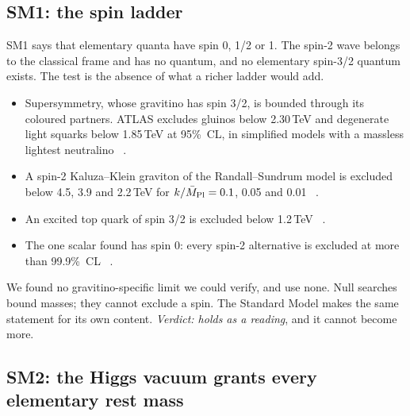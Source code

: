 \subsection{SM1: the spin ladder}\label{sec:sm-spin}

SM1 says that elementary quanta have spin 0, 1/2 or 1. The spin-2 wave belongs to the classical frame and has no quantum, and no elementary
spin-3/2 quantum exists. The test is the absence of what a richer ladder would add.
\begin{itemize}[nosep]
\item Supersymmetry, whose gravitino has spin 3/2, is bounded through its coloured partners. ATLAS excludes gluinos below 2.30\,TeV and
degenerate light squarks below 1.85\,TeV at 95\%~CL, in simplified models with a massless lightest neutralino~\cite{atlas2021a}
.
\item A spin-2 Kaluza--Klein graviton of the Randall--Sundrum model is excluded below 4.5, 3.9 and 2.2\,TeV for $k/\bar M_{\rm Pl}=0.1$, 0.05
and 0.01~\cite{atlas2021b} .
\item An excited top quark of spin 3/2 is excluded below 1.2\,TeV~\cite{cms2018} .
\item The one scalar found has spin 0: every spin-2 alternative is excluded at more than 99.9\%~CL~\cite{atlas2015} .
\end{itemize}
We found no gravitino-specific limit we could verify, and use none. Null searches bound masses; they cannot exclude a spin. The Standard
Model makes the same statement for its own content. \emph{Verdict: holds as a reading}, and it cannot become more.

\subsection{SM2: the Higgs vacuum grants every elementary rest mass}\label{sec:sm-higgs}


